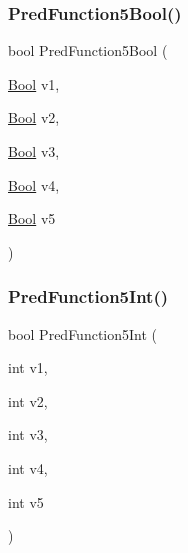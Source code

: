 \subsubsection{\texorpdfstring{PredFunction5Bool()}{PredFunction5Bool()}}
{\footnotesize\ttfamily bool Pred\+Function5\+Bool (\begin{DoxyParamCaption}\item[{\mbox{\hyperlink{struct_bool}{Bool}}}]{v1,  }\item[{\mbox{\hyperlink{struct_bool}{Bool}}}]{v2,  }\item[{\mbox{\hyperlink{struct_bool}{Bool}}}]{v3,  }\item[{\mbox{\hyperlink{struct_bool}{Bool}}}]{v4,  }\item[{\mbox{\hyperlink{struct_bool}{Bool}}}]{v5 }\end{DoxyParamCaption})}

\mbox{\label{_obj__test_2lib_2googletest-release-1_88_81_2googletest_2test_2gtest__pred__impl__unittest_8cc_ac2bb9ad4db9fc578bd739bbba5aa374f}} 
\subsubsection{\texorpdfstring{PredFunction5Int()}{PredFunction5Int()}}
{\footnotesize\ttfamily bool Pred\+Function5\+Int (\begin{DoxyParamCaption}\item[{int}]{v1,  }\item[{int}]{v2,  }\item[{int}]{v3,  }\item[{int}]{v4,  }\item[{int}]{v5 }\end{DoxyParamCaption})}

\mbox{\label{_obj__test_2lib_2googletest-release-1_88_81_2googletest_2test_2gtest__pred__impl__unittest_8cc_acf6422eca13944f695085fc6c7527748}} 
